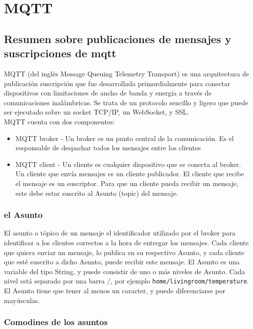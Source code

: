 \chapter{MQTT}

\section{Resumen sobre publicaciones de mensajes y suscripciones de mqtt}

MQTT (del inglés Message Queuing Telemetry Transport) es una arquitectura de publicación suscripción que fue desarrollada primordialmente para conectar dispositivos con limitaciones de ancho de banda y energía a través de comunicaciones inalámbricas. Se trata de un protocolo sencillo y ligero que puede ser ejecutado sobre un socket TCP/IP, un WebSocket, y SSL. \\

MQTT cuenta con dos componentes: 

\begin{itemize}
    \item MQTT broker - Un broker es un punto central de la comunicación. Es el responsable de despachar todos los mensajes entre los clientes
    \item MQTT client - Un cliente es cualquier dispositivo que se conecta al broker. Un cliente que envía mensajes es un cliente publicador. El cliente que recibe el mensaje es un suscriptor. Para que un cliente pueda recibir un mensaje, este debe estar suscrito al Asunto (topic) del mensaje.
\end{itemize}

\subsection{el Asunto}
El asunto o tópico de un mensaje el identificador utilizado por el broker para identificar a los clientes correctos a la hora de entregar los mensajes. Cada cliente que quiera enviar un mensaje, lo publica en su respectivo Asunto, y cada cliente que esté suscrito a dicho Asunto, puede recibir este mensaje. El Asunto es una variable del tipo String, y puede consistir de uno o más niveles de Asunto. Cada nivel está separado por una barra /, por ejemplo \texttt{home/livingroom/temperature}. El Asunto tiene que tener al menos un caracter, y puede diferenciarse por mayúsculas. 

\subsection{Comodines de los asuntos}

